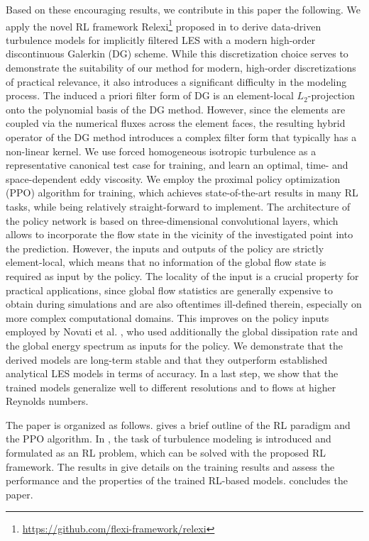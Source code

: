 Based on these encouraging results, we contribute in this paper the following.
We apply the novel RL framework Relexi\footnote{\url{https://github.com/flexi-framework/relexi}} proposed in \cite{kurz2022deep,kurz2022relexi} to derive data-driven turbulence models for implicitly filtered LES with a modern high-order discontinuous Galerkin (DG) scheme.
While this discretization choice serves to demonstrate the suitability of our method for modern, high-order discretizations of practical relevance, it also introduces a significant difficulty in the modeling process.
The induced a priori filter form of DG is an element-local $L_2$-projection onto the polynomial basis of the DG method.
However, since the elements are coupled via the numerical fluxes across the element faces, the resulting hybrid operator of the DG method introduces a complex filter form that typically has a non-linear kernel.
We use forced homogeneous isotropic turbulence as a representative canonical test case for training, and learn an optimal, time- and space-dependent eddy viscosity.
We employ the proximal policy optimization (PPO) algorithm for training, which achieves state-of-the-art results in many RL tasks, while being relatively straight-forward to implement.
The architecture of the policy network is based on three-dimensional convolutional layers, which allows to incorporate the flow state in the vicinity of the investigated point into the prediction.
However, the inputs and outputs of the policy are strictly element-local, which means that no information of the global flow state is required as input by the policy.
The locality of the input is a crucial property for practical applications, since global flow statistics are generally expensive to obtain during simulations and are also oftentimes ill-defined therein, especially on more complex computational domains.
This improves on the policy inputs employed by Novati et al. \cite{novati2021automating}, who used additionally the global dissipation rate and the global energy spectrum as inputs for the policy.
We demonstrate that the derived models are long-term stable and that they outperform established analytical LES models in terms of accuracy.
In a last step, we show that the trained models generalize well to different resolutions and to flows at higher Reynolds numbers.

The paper is organized as follows.
 gives a brief outline of the RL paradigm and the PPO algorithm.
In , the task of turbulence modeling is introduced and formulated as an RL problem, which can be solved with the proposed RL framework.
The results in  give details on the training results and assess the performance and the properties of the trained RL-based models.
 concludes the paper.


